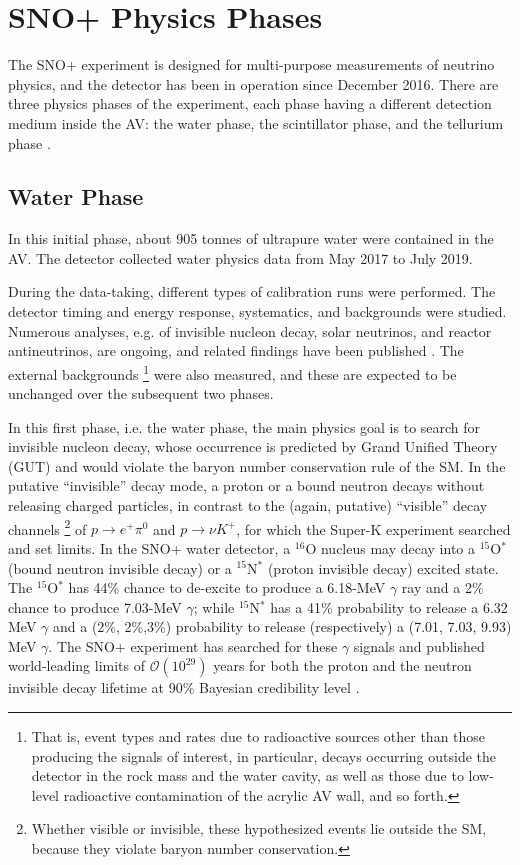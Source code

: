 \section{SNO+ Physics Phases}\label{sect:physicsPhase}

The SNO+ experiment is designed for multi-purpose measurements of neutrino physics, and the detector has been in operation since December 2016. There are three physics phases of the experiment, each phase having a different detection medium inside the AV: the water phase, the scintillator phase, and the tellurium phase \cite{whitepaper}. 

\subsection{Water Phase} \label{sect:waterPhase}

In this initial phase, about 905 tonnes of ultrapure water were contained in the AV. The detector collected water physics data from May 2017 to July 2019.

During the data-taking, different types of calibration runs were performed. The detector timing and energy response, systematics, and backgrounds were studied. Numerous analyses, e.g. of invisible nucleon decay, solar neutrinos, and reactor antineutrinos, are ongoing, and related findings have been published \cite{anderson2019measurement,anderson2019search,anderson2020measurement,anderson2021optical}. The external backgrounds \footnote{That is, event types and rates due to radioactive sources other than those producing the signals of interest, in particular, decays occurring outside the detector in the rock mass and the water cavity, as well as those due to low-level radioactive contamination of the acrylic AV wall, and so forth.} were also measured, and these are expected to be unchanged over the subsequent two phases.

In this first phase, i.e. the water phase, the main physics goal is to search for invisible nucleon decay, whose occurrence is predicted by Grand Unified Theory (GUT) and would violate the baryon number conservation rule of the SM. In the putative ``invisible'' decay mode, a proton or a bound neutron decays without releasing charged particles, in contrast to the (again, putative) ``visible'' decay channels \footnote{Whether visible or invisible, these hypothesized events lie outside the SM, because they violate baryon number conservation.} of $p\to e^+ \pi^0$ and $p\to\nu K^+$, for which the Super-K experiment searched and set limits. In the SNO+ water detector, a $^{16}$O nucleus may decay into a $^{15}$O$^*$ (bound neutron invisible decay) or a $ ^{15}$N$^*$ (proton invisible decay) excited state. The $^{15}$O$^*$ has 44\% chance to de-excite to produce a 6.18-MeV $\gamma$ ray and a 2\% chance to produce 7.03-MeV $\gamma$; while $^{15}$N$^*$ has a 41\% probability to release a 6.32 MeV $\gamma$ and a (2\%, 2\%,3\%) probability to release (respectively) a (7.01, 7.03, 9.93) MeV $\gamma$. The SNO+ experiment has searched for these $\gamma$ signals and published world-leading limits of $\mathcal{O}(10^{29})$ years for both the proton and the neutron invisible decay lifetime at 90\% Bayesian credibility level \cite{anderson2019search}. 

